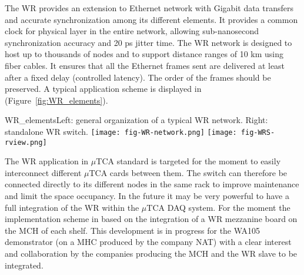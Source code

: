 The WR provides an extension to Ethernet network with Gigabit data transfers and accurate synchronization among its different elements. It provides a common clock for physical layer in the entire network, allowing sub-nanosecond synchronization accuracy and 20 ps jitter time. The WR network is designed to host up to thousands of nodes and to support distance ranges of 10 km using fiber cables. It ensures that all the Ethernet frames sent are delivered at least after a fixed delay (controlled latency). The order of the frames should be preserved.  A typical application scheme is displayed in  (Figure~\ref{fig:WR_elements}).

\begin{cdrfigure}{WR_elements}{\small Left: general organization of a typical WR network. Right: standalone WR switch.}
\texttt{[image: fig-WR-network.png]}
\texttt{[image: fig-WRS-rview.png]}
\end{cdrfigure}

The WR application in $\mu$TCA standard is targeted for the moment to easily interconnect different $\mu$TCA cards between them. The switch can therefore be connected directly to its different nodes in the same rack to improve maintenance and limit the space occupancy. In the future it may be very powerful to have a  full integration of the WR within the $\mu$TCA DAQ system. For the moment the implementation scheme in based on the integration of a WR mezzanine board on the MCH of each shelf. This development is in progress for the WA105 demonstrator  (on a MHC  produced by the company NAT) with a clear interest and collaboration by the companies producing the MCH and the WR slave to be integrated.   
 